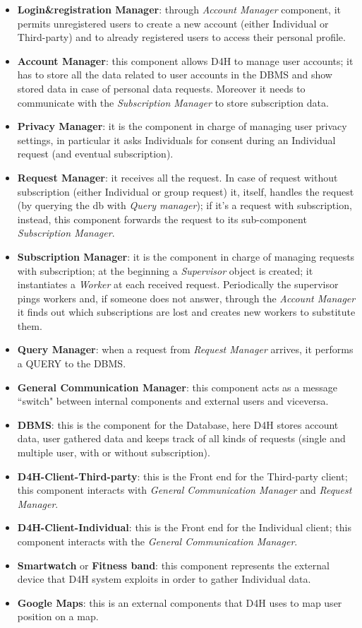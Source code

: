 \begin{itemize}
    \item \textbf{Login\&registration Manager}:  through \emph{Account Manager}  component, it permits unregistered users to create a new account (either Individual or Third-party) and to already registered users to access their personal profile.
    \item \textbf{Account Manager}: this component allows D4H to manage user accounts; it has to store all the data related to user accounts in the DBMS and show stored data in case of personal data requests. Moreover it needs to communicate with the \emph{Subscription Manager} to store subscription data.
    \item \textbf{Privacy Manager}: it is the component in charge of managing user privacy settings, in particular it asks Individuals for consent during an Individual request (and eventual subscription).
    \item \textbf{Request Manager}: it receives all the request. In case of request without subscription (either Individual or group request) it, itself, handles the request (by querying the db with \emph{Query manager}); if it's a request with subscription, instead, this component forwards the request to its sub-component \emph{Subscription Manager}.
    \item \textbf{Subscription Manager}: it is the component in charge of managing requests with subscription; at the beginning a \emph{Supervisor} object is created; it instantiates a \emph{Worker} at each received request. Periodically the supervisor pings workers and, if someone does not answer, through the \emph{Account Manager} it finds out which subscriptions are lost and creates new workers to substitute them. 
    \item \textbf{Query Manager}: when a request from \emph{Request Manager} arrives, it performs a QUERY to the DBMS.
    \item \textbf{General Communication Manager}: this component acts as a message ``switch" between internal components and external users and viceversa.
    \item \textbf{DBMS}: this is the component for the Database, here D4H stores account data, user gathered data and keeps track of all kinds of requests (single and multiple user, with or without subscription).
    \item \textbf{D4H-Client-Third-party}: this is the Front end for the Third-party client; this component interacts with \emph{General Communication Manager} and \emph{Request Manager}.
    \item \textbf{D4H-Client-Individual}: this is the Front end for the Individual client; this component interacts with the \emph{General Communication Manager}.
    \item \textbf{Smartwatch} or \textbf{Fitness band}: this component represents the external device that D4H system exploits in order to gather Individual data.
    \item \textbf{Google Maps}: this is an external components that D4H uses to map user position on a map.
\end{itemize}


